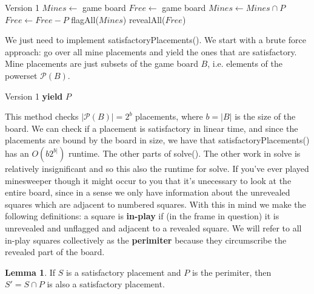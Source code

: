 \documentclass{article}
\theoremstyle{definition}
\theoremstyle{definition}
\theoremstyle{theorem}
\newtheorem*{lemma}{Lemma}
\begin{document}
	\begin{algorithmic}
		 \Comment Version 1
		\State $Mines \gets$ game board
		\State $Free \gets$ game board
		\State $Mines \gets Mines \cap P$
		\State $Free \gets Free -  P$
		\EndFor
		\State flagAll($Mines$)
		\State revealAll($Free$)
		\EndFunction
	\end{algorithmic}
	
	We just need to implement satisfactoryPlacements(). We start with a brute force approach: go over all mine placements and yield the ones that are satisfactory. Mine placements are just subsets of the game board $B$, i.e. elements of the powerset $\mathcal{P}(B)$.
	
	\begin{algorithmic}
		 \Comment Version 1
		\For{$P$ in $\mathcal{P}(B)$}
		\If{$P$ is satisfactory}
		\State \textbf{yield} $P$
		\EndIf
		\EndFor
		\EndFunction
	\end{algorithmic}
	
	This method checks $|\mathcal{P}(B)| = 2^{b}$ placements, where $b = |B|$ is the size of the board. We can check if a placement is satisfactory in linear time, and since the placements are bound by the board in size, we have that satisfactoryPlacements() has an $O(b2^{b|})$ runtime. The other parts of solve(). The other work in solve is relatively insignificant and so this also the runtime for solve. If you've ever played minesweeper though it might occur to you that it's unecessary to look at the entire board, since in a sense we only have information about the unrevealed squares which are adjacent to numbered squares. With this in mind we make the following definitions: a square is \textbf{in-play} if (in the frame in question) it is unrevealed and unflagged and adjacent to a revealed square. We will refer to all in-play squares collectively as the \textbf{perimiter} because they circumscribe the revealed part of the board.
	
	\begin{lemma}
		If $S$ is a satisfactory placement and $P$ is the perimiter,  then $S' = S \cap P$ is also a satisfactory placement.
	\end{lemma}
\end{document}
